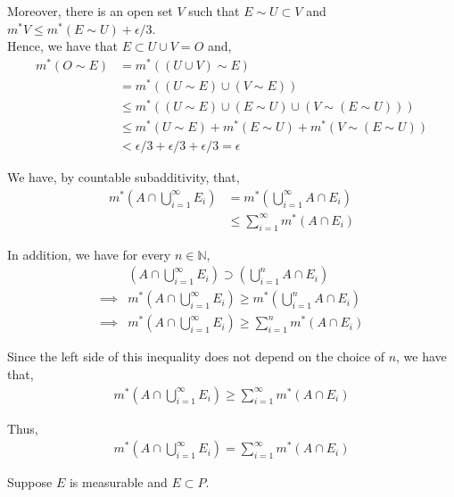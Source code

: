 \documentclass[12pt]{article}
\newenvironment{problem}[2][Problem]{\begin{trivlist}
\item[\hskip \labelsep {\bfseries #1}\hskip \labelsep {\bfseries #2.}]}{\end{trivlist}}
\begin{document}
Moreover, there is an open set $V$ such that $E \sim U \subset V$ and $m^*V \leq m^*(E \sim U) + \epsilon/3$.\\

Hence, we have that $E \subset U \cup V = O$ and,
\begin{align*}
m^*(O \sim E) &= m^*((U \cup V) \sim E)\\
&= m^*((U \sim E) \cup (V \sim E))\\
&\leq m^*((U \sim E) \cup (E \sim U) \cup (V \sim (E \sim U)))\\
&\leq m^*(U \sim E) + m^*(E \sim U) + m^*(V \sim (E \sim U))\\
&< \epsilon/3 + \epsilon/3 + \epsilon/3 = \epsilon
\end{align*}

\begin{problem}{3}
\end{problem}

We have, by countable subadditivity, that,
\begin{align*}
m^*\left(A \cap \bigcup_{i=1}^{\infty} E_i\right) &= m^*\left(\bigcup_{i=1}^{\infty} A \cap E_i\right)\\
&\leq \sum_{i=1}^{\infty} m^*(A \cap E_i)
\end{align*}

In addition, we have for every $n \in \mathbb{N}$,
\begin{align*}
&\left(A \cap \bigcup_{i=1}^{\infty} E_i\right) \supset \left(\bigcup_{i=1}^{n} A \cap E_i\right)\\
\implies &m^*\left(A \cap \bigcup_{i=1}^{\infty} E_i\right) \geq m^*\left(\bigcup_{i=1}^{n} A \cap E_i\right)\\
\implies &m^*\left(A \cap \bigcup_{i=1}^{\infty} E_i\right) \geq \sum_{i=1}^{n} m^*(A \cap E_i)
\end{align*}

Since the left side of this inequality does not depend on the choice of $n$, we have that, 
\begin{align*}
m^*\left(A \cap \bigcup_{i=1}^{\infty} E_i\right) \geq \sum_{i=1}^{\infty} m^*(A \cap E_i)
\end{align*}

Thus,
\begin{align*}
m^*\left(A \cap \bigcup_{i=1}^{\infty} E_i\right) = \sum_{i=1}^{\infty} m^*(A \cap E_i)
\end{align*}

\begin{problem}{4}
\end{problem}

Suppose $E$ is measurable and $E \subset P$.
\end{document}
